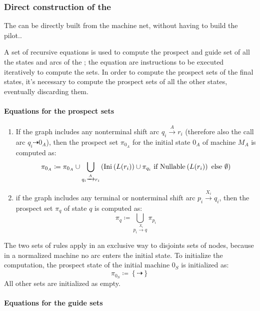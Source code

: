 \documentclass[english]{article}
\begin{document}
\subsubsection{Direct construction of the \PCFG}
\label{sec:direct-contruction-pcfg}

The \PCFG can be directly built from the machine net, without having to build the \elro pilot..

A set of recursive equations is used to compute the prospect and guide set of all the states and arcs of the \PCFG;
the equation are instructions to be executed iteratively to compute the sets.
In order to compute the prospect sets of the final states, it's necessary to compute the prospect sets of all the other states, eventually discarding them.

\paragraph*{Equations for the prospect sets}

\begin{enumerate}
  \item If the graph includes any nonterminal shift arc \(q_i \xrightarrow{A} r_i\) (therefore also the call arc \(q_i \dashrightarrow 0_A\)), then the prospect set \(\pi_{0_A}\) for the initial state \(0_A\) of machine \(M_A\) is computed as:
        \[ \pi_{0_A} \coloneqq \pi_{0_A} \cup \bigcup_{q_i \xrightarrow{A} r_i} \left(  \text{Ini}\hspace{0.1ex} \left( L(r_i) \right) \cup \pi_{q_i} \ \text{if} \ \text{Nullable}\hspace{0.1ex} \left( L(r_i) \right) \ \text{else} \ \emptyset \right) \]
  \item if the graph includes any terminal or nonterminal shift arc \(p_i \xrightarrow{X_i} q_i\), then the prospect set \(\pi_q\) of state \(q\) is computed as:
        \[ \pi_q \coloneqq \bigcup_{p_i \xrightarrow{X_i} q} \pi_{p_i} \]
\end{enumerate}

The two sets of rules apply in an exclusive way to disjoints sets of nodes, because in a normalized machine no arc enters the initial state. To initialize the computation, the prospect state of the initial machine \(0_S\) is initialized as:
\[ \pi_{0_S} \coloneqq \left\{ \dashrightarrow \right\} \]
All other sets are initialized as empty.

\paragraph*{Equations for the guide sets}
\end{document}
